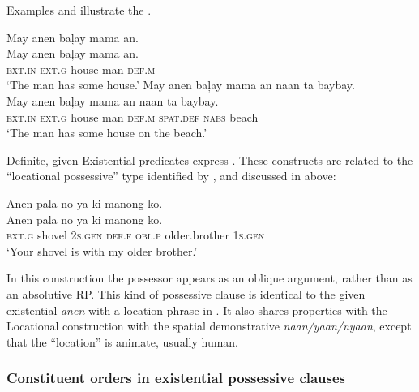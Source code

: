 Examples  and  illustrate the .

\ea
\label{ex:manhassomehouse}
May  anen  baļay  mama  an. \\\smallskip \gll May  anen  baļay  mama  an. \\
\textsc{ext.in}  \textsc{ext.g}  house  man  \textsc{def.m} \\
\glt ‘The man has some house.’
\z
\ea
\label{ex:manhassomehouseonbeach}
May  anen  baļay  mama  an  naan  ta  baybay. \\\smallskip
\gll May  anen  baļay  mama  an  naan  ta  baybay. \\
\textsc{ext.in}  \textsc{ext.g}  house  man  \textsc{def.m}  \textsc{spat.def}  \textsc{nabs} beach \\
\glt ‘The man has some house on the beach.’
\z

\hspace*{-0.6pt}Definite, given Existential predicates express . These constructs are related to the “locational possessive” type identified by \citet[49]{stassen2009}, and discussed in  above:

\ea
Anen  pala  no  ya  ki  manong  ko. \\\smallskip \gll Anen  pala  no  ya  ki  manong  ko. \\
\textsc{ext.g}  shovel  2\textsc{s.gen}  \textsc{def.f}  \textsc{obl.p}  older.brother  1\textsc{s.gen} \\
\glt \textsc{‘}Your shovel is with my older brother.’
\z

In this construction the possessor appears as an oblique argument, rather than as an absolutive RP. This kind of possessive clause is identical to the given existential \textit{anen} with a location phrase in . It also shares properties with the Locational construction with the spatial demonstrative \textit{naan/yaan/nyaan}, except that the “location” is animate, usually human. 

\subsubsection{Constituent orders in existential possessive clauses}

